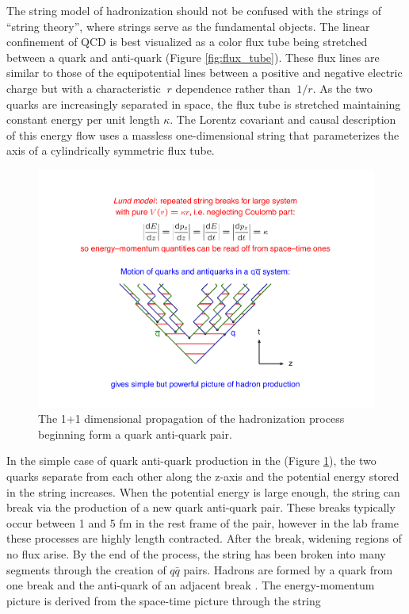 The string model of hadronization should not be confused with the strings of ``string theory'', where strings serve as the fundamental objects.  The linear confinement of QCD is best visualized as a color flux tube being stretched between a 
quark and anti-quark (Figure \ref{fig:flux_tube}). These flux lines are similar
to those of the equipotential lines between a positive and negative electric charge but with a characteristic 
$~r$ dependence rather than $~1/r$. 
As the two quarks are increasingly separated in space, the flux tube is stretched maintaining constant energy
 per unit length $\kappa$. The Lorentz covariant and
causal description of this energy flow uses a massless one-dimensional string that parameterizes the axis of a cylindrically symmetric flux tube. 
\begin{figure}
\begin{center}
\includegraphics[width=.65\textwidth]{pics/lund_model}
\end{center}
\caption{The 1+1 dimensional propagation of the hadronization process beginning form a quark anti-quark pair.  }
\label{fig:lund}
\end{figure}
In the simple case of quark anti-quark production in the (Figure \ref{fig:lund}), the two quarks separate 
from each other along the z-axis and the potential energy stored in the 
string increases. When the potential energy is large enough, the string can break via the production
 of a new quark anti-quark pair. These breaks typically occur between 1 and 5 fm in the rest
 frame of the pair, however in the lab frame these processes are highly length contracted. 
After the break, widening regions of no flux arise. By the end of the process, the string has been broken into many
segments through the creation of $q\bar{q}$ pairs. Hadrons are formed by a quark from one break and the anti-quark
of an adjacent break \cite{mcreview}. The energy-momentum picture is derived from the space-time picture through the string
